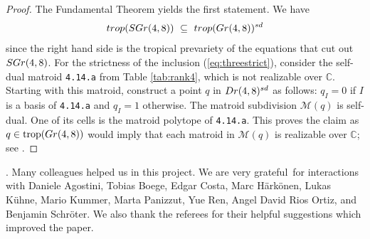 \documentclass[12pt]{extarticle}
\theoremstyle{definition}
\numberwithin{theorem}{section}
\theoremstyle{plain}\newtheorem{ithm}{Theorem}
\begin{document}
    \begin{proof}
  The Fundamental Theorem \cite[Theorem 3.2.3]{MS} yields the first statement.
We have
  \begin{equation} \label{eq:containmen}
  {\rm trop}({\rm SGr}(4,8)) \,\, \subseteq \, \,{\rm trop}({\rm Gr}(4,8))^{\rm sd} 
  \end{equation}
since the right hand side is the tropical prevariety of the
equations that cut out ${\rm SGr}(4,8)$. For the strictness of the inclusion (\ref{eq:threestrict}),
consider the  self-dual matroid {\tt 4.14.a} from Table \ref{tab:rank4}, which is not realizable over $\mathbb{C}$. Starting with this matroid, construct
    a point $q$ in  ${\rm Dr}(4,8)^{\rm sd}$ as follows: 
$q_I = 0$ if $I$ is a basis   of {\tt 4.14.a} and $q_I = 1$ otherwise. The matroid subdivision $\mathcal{M}(q)$ 
is self-dual. One of its cells is the matroid polytope of {\tt 4.14.a}.
This proves the claim as
$q \in \text{trop}({\rm Gr}(4,8))$ would imply that each matroid in $\mathcal{M}(q)$ is
  realizable over $\mathbb{C}$; see \cite{BS}.
 \end{proof}

\vspace{.2in}

.
Many colleagues helped us in this project.
We are very grateful~for interactions with
Daniele Agostini,
Tobias Boege, Edgar Costa, Marc H\"{a}rk\"{o}nen, Lukas K\"uhne, Mario Kummer, Marta Panizzut, Yue Ren, Angel David Rios Ortiz,  
and Benjamin Schr\"oter. We also thank the referees for their helpful suggestions which improved the paper.

\bigskip
\end{document}
